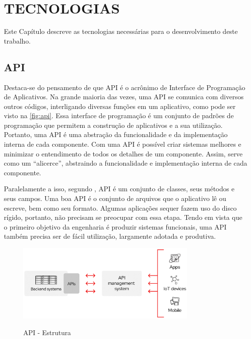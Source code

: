 
\chapter{TECNOLOGIAS}

Este Capítulo descreve as tecnologias necessárias para o desenvolvimento deste trabalho.

\section{API}
Destaca-se do pensamento de  que API é o acrônimo de Interface de Programação de Aplicativos. Na grande maioria das vezes, uma API se comunica com diversos outros códigos, interligando diversas funções em um aplicativo, como pode ser visto na \autoref{fig:api}. Essa interface de programação é um conjunto de padrões de programação que permitem a construção de aplicativos e a sua utilização. Portanto, uma API é uma abstração da funcionalidade e da implementação interna de cada componente. Com uma API é possível criar sistemas melhores e minimizar o entendimento de todos os detalhes de um componente. Assim, serve como um “alicerce”, abstraindo a funcionalidade e implementação interna de cada componente.

Paralelamente a isso, segundo , API é um conjunto de classes, seus métodos e seus campos.
Uma boa API é o conjunto de arquivos que o aplicativo lê ou escreve, bem como seu formato. Algumas aplicações sequer fazem uso do disco rígido, portanto, não precisam se preocupar com essa etapa. Tendo em vista que o primeiro objetivo da engenharia é produzir sistemas funcionais, uma API também precisa ser de fácil utilização, largamente adotada e produtiva.

\begin{figure}[H]
    \centering
    \caption{API -  Estrutura}
    \includegraphics[width=0.8\textwidth]{./dados/figuras/fig10}
    \label{fig:api}
\end{figure}

